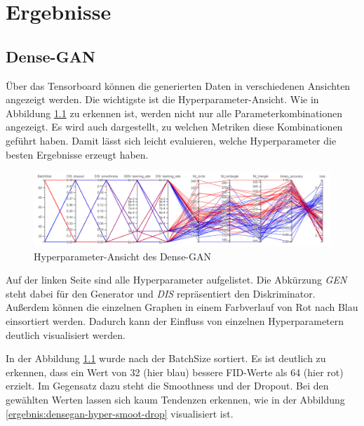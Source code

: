 
\chapter{Ergebnisse}

\section{Dense-GAN}
Über das Tensorboard können die generierten Daten in verschiedenen Ansichten angezeigt werden.
Die wichtigste ist die Hyperparameter-Ansicht.
Wie in Abbildung \ref{ergebnis:densegan-hyper} zu erkennen ist, werden nicht nur alle Parameterkombinationen angezeigt.
Es wird auch dargestellt, zu welchen Metriken diese Kombinationen geführt haben.
Damit lässt sich leicht evaluieren, welche Hyperparameter die besten Ergebnisse erzeugt haben.

\begin{figure}[H]
	\centering
	\includegraphics[width=0.75\textheight]{kapitel/5_ergebnisse/densegan/hyperparameter.PNG}
	\caption{Hyperparameter-Ansicht des Dense-GAN}
	\label{ergebnis:densegan-hyper}
\end{figure}

Auf der linken Seite sind alle Hyperparameter aufgelistet.
Die Abkürzung \textit{GEN} steht dabei für den Generator und \textit{DIS} repräsentiert den Diskriminator.
Außerdem können die einzelnen Graphen in einem Farbverlauf von Rot nach Blau einsortiert werden.
Dadurch kann der Einfluss von einzelnen Hyperparametern deutlich visualisiert werden.
\newline

In der Abbildung \ref{ergebnis:densegan-hyper} wurde nach der BatchSize sortiert.
Es ist deutlich zu erkennen, dass ein Wert von 32 (hier blau) bessere FID-Werte als 64 (hier rot) erzielt.
Im Gegensatz dazu steht die Smoothness und der Dropout.
Bei den gewählten Werten lassen sich kaum Tendenzen erkennen, wie in der Abbildung \ref{ergebnis:densegan-hyper-smoot-drop} visualisiert ist.

